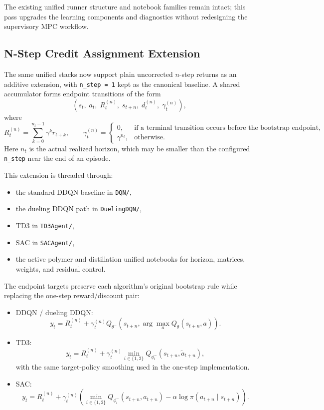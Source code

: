 The existing unified runner structure and notebook families remain intact; this pass upgrades the learning components and diagnostics without redesigning the supervisory MPC workflow.

\subsection{N-Step Credit Assignment Extension}
The same unified stacks now support plain uncorrected $n$-step returns as an additive extension, with \texttt{n\_step = 1} kept as the canonical baseline. A shared accumulator forms endpoint transitions of the form
\[
\left(s_t,\; a_t,\; R_t^{(n)},\; s_{t+n},\; d_t^{(n)},\; \gamma_t^{(n)}\right),
\]
where
\[
R_t^{(n)} = \sum_{k=0}^{n_t-1} \gamma^k r_{t+k},
\qquad
\gamma_t^{(n)} =
\begin{cases}
0, & \text{if a terminal transition occurs before the bootstrap endpoint},\\
\gamma^{n_t}, & \text{otherwise.}
\end{cases}
\]
Here $n_t$ is the actual realized horizon, which may be smaller than the configured \texttt{n\_step} near the end of an episode.

This extension is threaded through:
\begin{itemize}
  \item the standard DDQN baseline in \texttt{DQN/},
  \item the dueling DDQN path in \texttt{DuelingDQN/},
  \item TD3 in \texttt{TD3Agent/},
  \item SAC in \texttt{SACAgent/},
  \item the active polymer and distillation unified notebooks for horizon, matrices, weights, and residual control.
\end{itemize}

The endpoint targets preserve each algorithm's original bootstrap rule while replacing the one-step reward/discount pair:
\begin{itemize}
  \item DDQN / dueling DDQN:
  \[
  y_t = R_t^{(n)} + \gamma_t^{(n)} Q_{\theta^-}\!\left(s_{t+n}, \arg\max_a Q_{\theta}(s_{t+n}, a)\right).
  \]
  \item TD3:
  \[
  y_t = R_t^{(n)} + \gamma_t^{(n)} \min_{i \in \{1,2\}} Q_{\phi_i^-}\!\left(s_{t+n}, \tilde a_{t+n}\right),
  \]
  with the same target-policy smoothing used in the one-step implementation.
  \item SAC:
  \[
  y_t = R_t^{(n)} + \gamma_t^{(n)} \left(\min_{i \in \{1,2\}} Q_{\phi_i^-}(s_{t+n}, a_{t+n}) - \alpha \log \pi(a_{t+n}\mid s_{t+n})\right).
  \]
\end{itemize}

